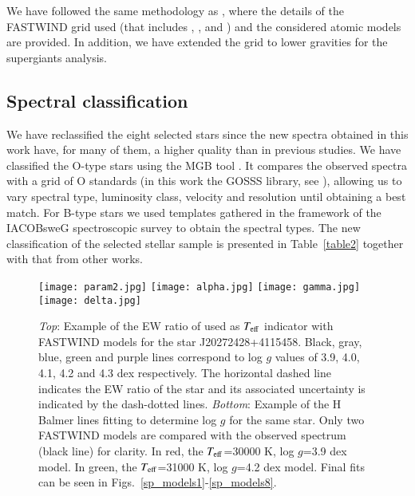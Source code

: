 \documentclass{aa} %
\begin{document}
We have followed the same methodology as \cite{ssimon10}, where the details of the FASTWIND grid used (that includes , ,  and ) and the considered atomic models are provided. In addition, we have extended the grid to lower gravities for the supergiants analysis.

 \subsection{Spectral classification}\label{sect30} 
 
We have reclassified the eight selected stars since the new spectra obtained in this work have, for many of them, a higher quality than in previous studies.
We have classified the O-type stars using the MGB tool \citep{maiz12}. It compares the observed spectra with a grid of O standards (in this work the GOSSS library, see \cite{maiz16}), allowing us to vary spectral type, luminosity class, velocity and resolution until obtaining a best match. For B-type stars we used templates gathered in the framework of the IACOBsweG spectroscopic survey \citep[][Negueruela et al. (in prep)]{ssimon15} to obtain the spectral types. 
The new classification of the selected stellar sample is presented in Table~\ref{table2} together with that from other works.



	
  \begin{figure}[t!]
\centering
\texttt{[image: param2.jpg]} 
\texttt{[image: alpha.jpg]}
\texttt{[image: gamma.jpg]}
\texttt{[image: delta.jpg]}
\caption{ \textit{Top}: Example of the EW ratio of   used as $T_{\rm eff}$ indicator with FASTWIND models for the star J20272428+4115458. Black, gray, blue, green and purple lines correspond to log $g$ values of 3.9, 4.0, 4.1, 4.2 and 4.3 dex respectively. The horizontal dashed line indicates the EW ratio of the star and its associated uncertainty is indicated by the dash-dotted lines. \textit{Bottom}: Example of the H Balmer lines fitting to determine log $g$ for the same star. Only two FASTWIND models are compared with the observed spectrum (black line) for clarity. In red, the $T_{\rm eff}$=30000 K, log $g$=3.9 dex model. In green, the $T_{\rm eff}$=31000 K, log $g$=4.2 dex model. Final fits can be seen in Figs.~\ref{sp_models1}-\ref{sp_models8}.}
\label{fig5a}
\end{figure}
\end{document}
